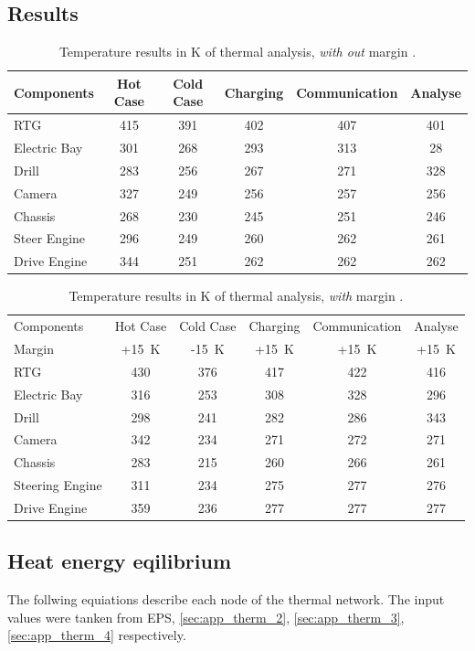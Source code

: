 \subsection{Results}
\begin{table}[htb]
	\centering
	\caption{Temperature results in K of thermal analysis, \textit{with out}  margin .}
	\begin{tabular}{lccccc}
		\toprule
		Components & Hot Case & Cold Case & Charging & Communication & Analyse  \\ \midrule
		RTG  & 415 & 391 & 402 & 407  &  401   \\
		Electric Bay & 301 & 268 & 293 & 313 & 28 \\
		Drill  & 283 & 256 & 267 & 271 & 328  \\
		Camera & 327 & 249 & 256 & 257 & 256 \\
		Chassis & 268 & 230  & 245 & 251 & 246 \\
		Steer Engine & 296 & 249 & 260 & 262 & 261  \\
		Drive Engine & 344 & 251 & 262 & 262 & 262 \\   \bottomrule
	\end{tabular}
	\label{tab:tcs_temp1}
\end{table}

\begin{table}[htb]
	\centering
	\caption{Temperature results in K of thermal analysis, \textit{with}  margin .}
	\begin{tabular}{lccccc}
		\hline
		Components & Hot Case & Cold Case & Charging & Communication & Analyse  \\[0.25em]
		Margin & +15~K & -15~K & +15~K & +15~K & +15~K \\ \hline
		RTG  & 430 & 376 & 417 & 422  & 416    \\
		Electric Bay & 316 & 253 & 308 & 328 & 296 \\
		Drill  & 298 & 241 & 282 & 286 & 343  \\
		Camera & 342 & 234 & 271 & 272 & 271 \\
		Chassis & 283 & 215 & 260 & 266 & 261 \\
		Steering Engine & 311 & 234 & 275 & 277 & 276  \\
		Drive Engine & 359 & 236 & 277 & 277 & 277 \\   \hline
	\end{tabular}
	\label{tab:tcs_temp2}
\end{table}



\subsection{Heat energy eqilibrium}  \label{sec:app_tcs_01}
The follwing equiations describe each node of the thermal network.
The input values were tanken from EPS, \autoref{sec:app_therm_2}, \autoref{sec:app_therm_3}, \autoref{sec:app_therm_4} respectively.

